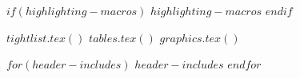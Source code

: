 $if(highlighting-macros)$
$highlighting-macros$
$endif$

$tightlist.tex()$
$tables.tex()$
$graphics.tex()$

$for(header-includes)$
$header-includes$
$endfor$